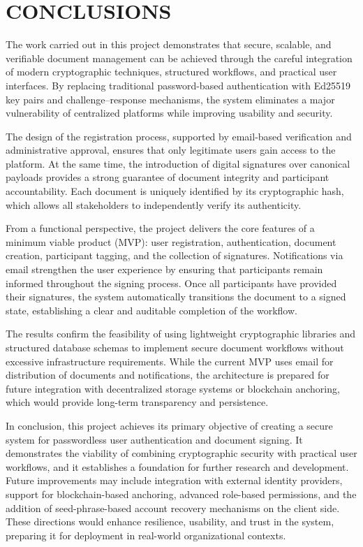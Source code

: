 \chapter*{CONCLUSIONS}

The work carried out in this project demonstrates that secure, scalable, and verifiable document management can be achieved through the careful integration of modern cryptographic techniques, structured workflows, and practical user interfaces. By replacing traditional password-based authentication with Ed25519 key pairs and challenge–response mechanisms, the system eliminates a major vulnerability of centralized platforms while improving usability and security.

The design of the registration process, supported by email-based verification and administrative approval, ensures that only legitimate users gain access to the platform. At the same time, the introduction of digital signatures over canonical payloads provides a strong guarantee of document integrity and participant accountability. Each document is uniquely identified by its cryptographic hash, which allows all stakeholders to independently verify its authenticity.

From a functional perspective, the project delivers the core features of a minimum viable product (MVP): user registration, authentication, document creation, participant tagging, and the collection of signatures. Notifications via email strengthen the user experience by ensuring that participants remain informed throughout the signing process. Once all participants have provided their signatures, the system automatically transitions the document to a signed state, establishing a clear and auditable completion of the workflow.

The results confirm the feasibility of using lightweight cryptographic libraries and structured database schemas to implement secure document workflows without excessive infrastructure requirements. While the current MVP uses email for distribution of documents and notifications, the architecture is prepared for future integration with decentralized storage systems or blockchain anchoring, which would provide long-term transparency and persistence.

In conclusion, this project achieves its primary objective of creating a secure system for passwordless user authentication and document signing. It demonstrates the viability of combining cryptographic security with practical user workflows, and it establishes a foundation for further research and development. Future improvements may include integration with external identity providers, support for blockchain-based anchoring, advanced role-based permissions, and the addition of seed-phrase-based account recovery mechanisms on the client side. These directions would enhance resilience, usability, and trust in the system, preparing it for deployment in real-world organizational contexts.
